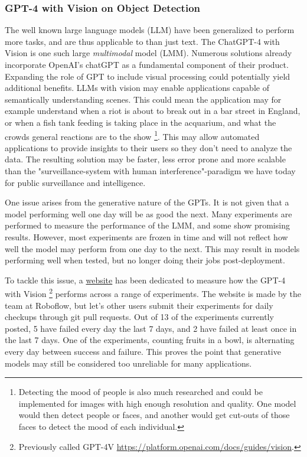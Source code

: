 \subsubsection{GPT-4 with Vision on Object Detection}

The well known large language models (LLM) have been generalized to perform more tasks, and are thus applicable to than just text. The ChatGPT-4 with Vision is one such large \textit{multimodal} model (LMM). Numerous solutions already incorporate OpenAI's chatGPT as a fundamental component of their product. Expanding the role of GPT to include visual processing could potentially yield additional benefits. LLMs with vision may enable applications capable of semantically understanding scenes. This could mean the application may for example understand when a riot is about to break out in a bar street in England, or when a fish tank feeding is taking place in the acquarium, and what the crowds general reactions are to the show \footnote{Detecting the mood of people is also much researched and could be implemented for images with high enough resolution and quality. One model would then detect people or faces, and another would get cut-outs of those faces to detect the mood of each individual.}. This may allow automated applications to provide insights to their users so they don't need to analyze the data. The resulting solution may be faster, less error prone and more scalable than the "surveillance-system with human interference"-paradigm we have today for public surveillance and intelligence.

One issue arises from the generative nature of the GPTs. It is not given that a model performing well one day will be as good the next. Many experiments are performed to measure the performance of the LMM, and some show promising results. However, most experiments are frozen in time and will not reflect how well the model may perform from one day to the next. This may result in models performing well when tested, but no longer doing their jobs post-deployment.

To tackle this issue, a \href{https://www.gptcheckup.com/}{website} has been dedicated to measure how the GPT-4 with Vision \footnote{Previously called GPT-4V \href{https://platform.openai.com/docs/guides/vision}{https://platform.openai.com/docs/guides/vision}.} performs across a range of experiments. The website is made by the team at Roboflow, but let's other users submit their experiments for daily checkups through git pull requests. Out of 13 of the experiments currently posted, 5 have failed every day the last 7 days, and 2 have failed at least once in the last 7 days. One of the experiments, counting fruits in a bowl, is alternating every day between success and failure. This proves the point that generative models may still be considered too unreliable for many applications.

